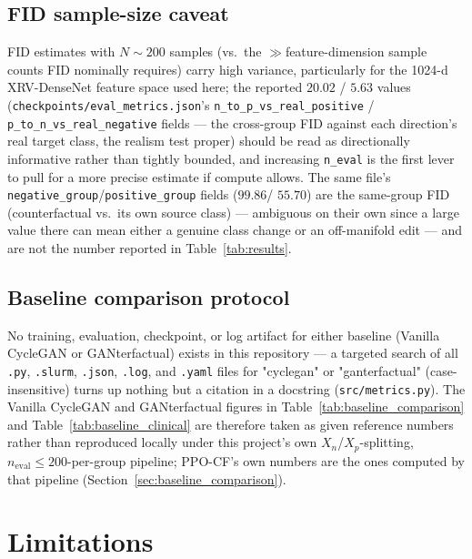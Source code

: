 \documentclass[11pt]{article}
\newcommand{\method}{\textsc{PPO-CF}}
\begin{document}
\subsection{FID sample-size caveat}

FID estimates with $N\!\sim\!200$ samples (vs.\ the $\gg$feature-dimension
sample counts FID nominally requires) carry high variance, particularly
for the 1024-d XRV-DenseNet feature space used here; the reported $20.02$
/ $5.63$ values (\texttt{checkpoints/eval\_metrics.json}'s
\texttt{n\_to\_p\_vs\_real\_positive} / \texttt{p\_to\_n\_vs\_real\_negative}
fields — the cross-group FID against each direction's real target class,
the realism test proper) should be read as directionally informative
rather than tightly bounded, and increasing \texttt{n\_eval} is the first
lever to pull for a more precise estimate if compute allows. The same
file's \texttt{negative\_group}/\texttt{positive\_group} fields ($99.86$/
$55.70$) are the same-group FID (counterfactual vs.\ its own source
class) — ambiguous on their own since a large value there can mean either
a genuine class change or an off-manifold edit — and are not the number
reported in Table~\ref{tab:results}.

\subsection{Baseline comparison protocol}
\label{sec:baseline_comparison_protocol}

No training, evaluation, checkpoint, or log artifact for either baseline
(Vanilla CycleGAN or GANterfactual) exists in this repository — a
targeted search of all \texttt{.py}, \texttt{.slurm}, \texttt{.json},
\texttt{.log}, and \texttt{.yaml} files for "cyclegan" or "ganterfactual"
(case-insensitive) turns up nothing but a citation in a docstring
(\texttt{src/metrics.py}). The Vanilla CycleGAN and GANterfactual figures
in Table~\ref{tab:baseline_comparison} and Table~\ref{tab:baseline_clinical}
are therefore taken as given reference numbers rather than reproduced
locally under this project's own $X_n$/$X_p$-splitting,
$n_{\text{eval}} \le 200$-per-group pipeline; \method{}'s own numbers are
the ones computed by that pipeline (Section~\ref{sec:baseline_comparison}).

\section{Limitations}
\end{document}
